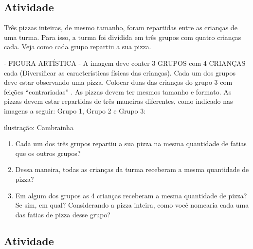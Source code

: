 \documentclass[a4,12pt]{book}
\begin{document}
\subsection{Atividade}







Três pizzas inteiras, de mesmo tamanho, foram repartidas entre as crianças de uma turma. Para isso, a turma foi dividida em três grupos com quatro crianças cada. Veja como cada grupo repartiu a sua pizza.

\begin{imagem*}[breakable]{}{}    - FIGURA ARTÍSTICA - A imagem deve conter 3 GRUPOS com 4 CRIANÇAS cada (Diversificar as características físicas das crianças). Cada um dos grupos deve estar observando uma pizza. Colocar duas das crianças do grupo 3 com feições   ``contrariadas''  . As pizzas devem ter mesmos tamanho e formato. As pizzas devem estar repartidas de três maneiras diferentes, como indicado nas imagens a seguir: Grupo 1, Grupo 2 e Grupo 3:


  ilustração: Cambrainha

\end{imagem*}

\begin{enumerate} [\quad a)] %
  \item     Cada um dos três grupos repartiu a sua pizza na mesma quantidade de fatias que os outros grupos?
  \item     Dessa maneira, todas as crianças da turma receberam a mesma quantidade de pizza?
  \item     Em algum dos grupos as 4 crianças receberam a mesma quantidade de pizza? Se sim, em qual? Considerando a pizza inteira, como você nomearia cada uma das fatias de pizza desse grupo?
\end{enumerate} %







\subsection{Atividade}
\end{document}
